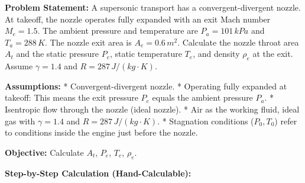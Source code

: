 \textbf{Problem Statement:} A supersonic transport has a
convergent-divergent nozzle. At takeoff, the nozzle operates fully
expanded with an exit Mach number \(M_e = 1.5\). The ambient pressure
and temperature are \(P_a = 101 \, kPa\) and \(T_a = 288 \, K\). The
nozzle exit area is \(A_e = 0.6 \, m^2\). Calculate the nozzle throat
area \(A_t\) and the static pressure \(P_e\), static temperature
\(T_e\), and density \(\rho_e\) at the exit. Assume \(\gamma = 1.4\) and
\(R = 287 \, J/(kg \cdot K)\).

\textbf{Assumptions:} * Convergent-divergent nozzle. * Operating fully
expanded at takeoff: This means the exit pressure \(P_e\) equals the
ambient pressure \(P_a\). * Isentropic flow through the nozzle (ideal
nozzle). * Air as the working fluid, ideal gas with \(\gamma = 1.4\) and
\(R = 287 \, J/(kg \cdot K)\). * Stagnation conditions (\(P_0, T_0\))
refer to conditions inside the engine just before the nozzle.

\textbf{Objective:} Calculate \(A_t\), \(P_e\), \(T_e\), \(\rho_e\).

\textbf{Step-by-Step Calculation (Hand-Calculable):}

